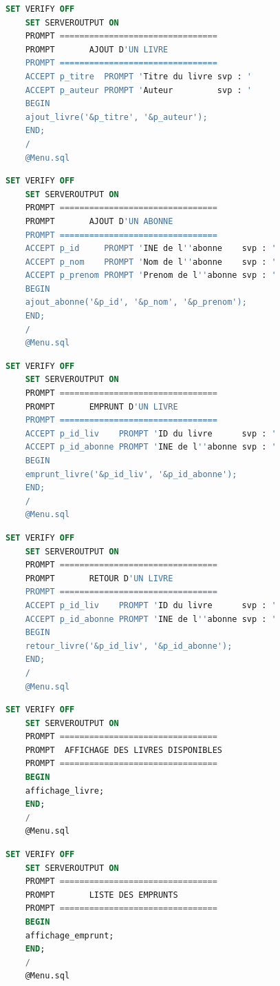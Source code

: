 \documentclass[12pt, a4paper]{report}
\begin{document}
\begin{lstlisting}[language=SQL, caption=ajout\_livre.sql]
	SET VERIFY OFF
	SET SERVEROUTPUT ON
	PROMPT ================================
	PROMPT       AJOUT D'UN LIVRE
	PROMPT ================================
	ACCEPT p_titre  PROMPT 'Titre du livre svp : '
	ACCEPT p_auteur PROMPT 'Auteur         svp : '
	BEGIN
	ajout_livre('&p_titre', '&p_auteur');
	END;
	/
	@Menu.sql
\end{lstlisting}

\begin{lstlisting}[language=SQL, caption=ajout\_abonne.sql]
	SET VERIFY OFF
	SET SERVEROUTPUT ON
	PROMPT ================================
	PROMPT       AJOUT D'UN ABONNE
	PROMPT ================================
	ACCEPT p_id     PROMPT 'INE de l''abonne    svp : '
	ACCEPT p_nom    PROMPT 'Nom de l''abonne    svp : '
	ACCEPT p_prenom PROMPT 'Prenom de l''abonne svp : '
	BEGIN
	ajout_abonne('&p_id', '&p_nom', '&p_prenom');
	END;
	/
	@Menu.sql
\end{lstlisting}

\begin{lstlisting}[language=SQL, caption=emprunt\_livre.sql]
	SET VERIFY OFF
	SET SERVEROUTPUT ON
	PROMPT ================================
	PROMPT       EMPRUNT D'UN LIVRE
	PROMPT ================================
	ACCEPT p_id_liv    PROMPT 'ID du livre      svp : '
	ACCEPT p_id_abonne PROMPT 'INE de l''abonne svp : '
	BEGIN
	emprunt_livre('&p_id_liv', '&p_id_abonne');
	END;
	/
	@Menu.sql
\end{lstlisting}

\begin{lstlisting}[language=SQL, caption=retour\_livre.sql]
	SET VERIFY OFF
	SET SERVEROUTPUT ON
	PROMPT ================================
	PROMPT       RETOUR D'UN LIVRE
	PROMPT ================================
	ACCEPT p_id_liv    PROMPT 'ID du livre      svp : '
	ACCEPT p_id_abonne PROMPT 'INE de l''abonne svp : '
	BEGIN
	retour_livre('&p_id_liv', '&p_id_abonne');
	END;
	/
	@Menu.sql
\end{lstlisting}

\begin{lstlisting}[language=SQL, caption=affichage\_livre.sql]
	SET VERIFY OFF
	SET SERVEROUTPUT ON
	PROMPT ================================
	PROMPT  AFFICHAGE DES LIVRES DISPONIBLES
	PROMPT ================================
	BEGIN
	affichage_livre;
	END;
	/
	@Menu.sql
\end{lstlisting}

\begin{lstlisting}[language=SQL, caption=affichage\_emprunt.sql]
	SET VERIFY OFF
	SET SERVEROUTPUT ON
	PROMPT ================================
	PROMPT       LISTE DES EMPRUNTS
	PROMPT ================================
	BEGIN
	affichage_emprunt;
	END;
	/
	@Menu.sql
\end{lstlisting}
\end{document}
